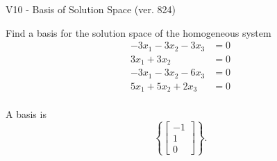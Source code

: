 \begin{exercise}
  \begin{exerciseTitle}V10 - Basis of Solution Space (ver. 824)\end{exerciseTitle}
  \begin{exerciseStatement}
    Find a basis for the solution space of the homogeneous system 
\begin{align*}
 -3 x_ 1 -3 x_ 2 -3 x_ 3 &= 0  \\ 
  3 x_ 1 + 3 x_ 2 &= 0  \\ 
  -3 x_ 1 -3 x_ 2 -6 x_ 3 &= 0  \\ 
  5 x_ 1 + 5 x_ 2 + 2 x_ 3 &= 0  \\ 
 \end{align*}


 
  \end{exerciseStatement}

  \begin{exerciseAnswer}
   A basis is   
\[\left\{\left[\begin{array}{c}
-1 \\
1 \\
0
\end{array}\right]\right\}.\]

  


  \end{exerciseAnswer}
\end{exercise}